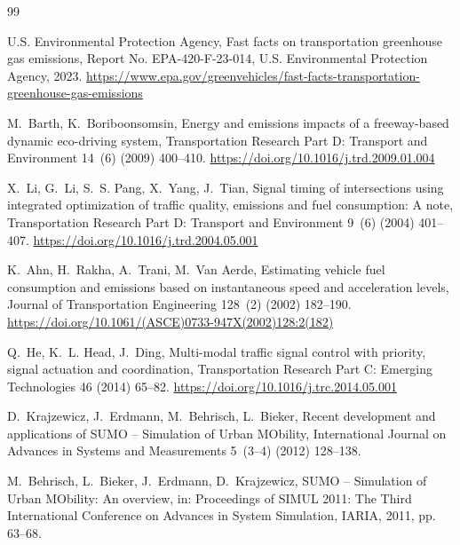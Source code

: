\documentclass[review,3p,authoryear,times]{elsarticle}
\begin{document}

% 
\begin{thebibliography}{99}

U.S. Environmental Protection Agency, Fast facts on transportation greenhouse
gas emissions, Report No. EPA-420-F-23-014, U.S. Environmental Protection
Agency, 2023.
\newline\url{https://www.epa.gov/greenvehicles/fast-facts-transportation-greenhouse-gas-emissions}

M.~Barth, K.~Boriboonsomsin, Energy and emissions impacts of a freeway-based
dynamic eco-driving system, Transportation Research Part D: Transport and
Environment 14~(6) (2009) 400--410.
\newline\url{https://doi.org/10.1016/j.trd.2009.01.004}

X.~Li, G.~Li, S.~S. Pang, X.~Yang, J.~Tian, Signal timing of intersections
using integrated optimization of traffic quality, emissions and fuel
consumption: A note, Transportation Research Part D: Transport and
Environment 9~(6) (2004) 401--407.
\newline\url{https://doi.org/10.1016/j.trd.2004.05.001}

K.~Ahn, H.~Rakha, A.~Trani, M.~Van Aerde, Estimating vehicle fuel consumption
and emissions based on instantaneous speed and acceleration levels, Journal
of Transportation Engineering 128~(2) (2002) 182--190.
\newline\url{https://doi.org/10.1061/(ASCE)0733-947X(2002)128:2(182)}

Q.~He, K.~L. Head, J.~Ding, Multi-modal traffic signal control with
priority, signal actuation and coordination, Transportation Research
Part C: Emerging Technologies 46 (2014) 65--82.
\newline\url{https://doi.org/10.1016/j.trc.2014.05.001}

D.~Krajzewicz, J.~Erdmann, M.~Behrisch, L.~Bieker, Recent development and
applications of SUMO -- Simulation of Urban MObility, International Journal
on Advances in Systems and Measurements 5~(3--4) (2012) 128--138.

M.~Behrisch, L.~Bieker, J.~Erdmann, D.~Krajzewicz, SUMO -- Simulation of Urban
MObility: An overview, in: Proceedings of SIMUL 2011: The Third
International Conference on Advances in System Simulation, IARIA, 2011,
pp. 63--68.


\end{thebibliography}
\end{document}
